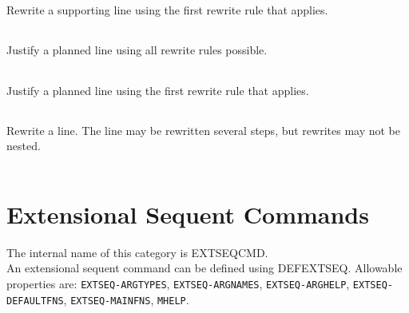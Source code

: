 \begin{description}
\item[\parbox{\textwidth}{SIMPLIFY-SUPP*}] \label{SIMPLIFY-SUPP*}
Rewrite a supporting line using the first rewrite 
rule that applies.\\
\texttt{ }


\item[\parbox{\textwidth}{UNREWRITE-PLAN*}] \label{UNREWRITE-PLAN*}
Justify a planned line using all rewrite rules possible.\\
\texttt{ }


\item[\parbox{\textwidth}{UNREWRITE-PLAN1}] \label{UNREWRITE-PLAN1}
Justify a planned line using the first rewrite rule that 
applies.\\
\texttt{ }


\item[\parbox{\textwidth}{USE-RRULES}] \label{USE-RRULES}
Rewrite a line. The line may be rewritten several steps,
but rewrites may not be nested.\\
\texttt{ }

\item
\end{description}
\chapter{Extensional Sequent Commands}
The internal name of this category is 
EXTSEQCMD.\\
An extensional sequent command can be defined using DEFEXTSEQ.
Allowable properties are: \texttt{EXTSEQ-ARGTYPES}, \texttt{EXTSEQ-ARGNAMES}, \texttt{EXTSEQ-ARGHELP}, \texttt{EXTSEQ-DEFAULTFNS}, \texttt{EXTSEQ-MAINFNS}, \texttt{MHELP}.

